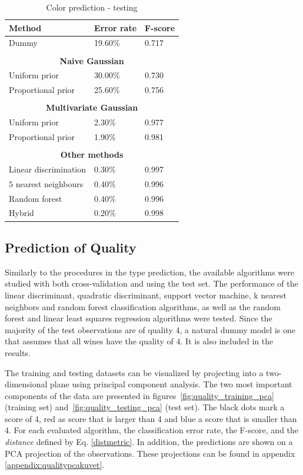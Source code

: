 \documentclass[twoside]{article}
\begin{document}
\begin{multicols}{2}
\begin{table}[H]
\caption{Color prediction - testing}
\label{table:color_testing}
\begin{tabular}{lll}
\textbf{Method} & \textbf{Error rate} & \textbf{F-score}\\
\midrule
Dummy & 19.60\% & 0.717 \\
\\
\multicolumn{3}{c}{\textbf{Naive Gaussian}} \\
Uniform prior & 30.00\% & 0.730 \\
Proportional prior & 25.60\% & 0.756 \\
\\
\multicolumn{3}{c}{\textbf{Multivariate Gaussian}} \\
Uniform prior & 2.30\% & 0.977 \\
Proportional prior & 1.90\% & 0.981 \\
\\
\multicolumn{3}{c}{\textbf{Other methods}} \\
Linear discrimination & 0.30\% & 0.997 \\
$5$ nearest neighbours & 0.40\% & 0.996 \\
Random forest & 0.40\% & 0.996 \\
Hybrid & 0.20\% & 0.998 \\

\end{tabular}
\end{table}

\subsection{Prediction of Quality}

Similarly to the procedures in the type prediction, the available algorithms were studied with both cross-validation and using the test set. 
The performance of the linear discriminant, quadratic discriminant, support vector machine, k nearest neighbors and random forest
classification algorithms, as well as the random forest and linear least squares regression algorithms were tested.
Since the majority of the test observations are of quality 4, a natural dummy model is one that assumes that all wines have the quality of 4.
It is also included in the results.

The training and testing datasets can be visualized by projecting into a two-dimensional plane using principal component analysis. The 
two most important components of the data are presented in figures~\ref{fig:quality_training_pca} (training set) and~\ref{fig:quality_testing_pca}
(test set).
The black dots mark a score of 4, red as score that is larger than 4 and blue a score that is smaller than 4.
For each evaluated algorithm, the classification error rate, the F-score, and the \emph{distance} defined by Eq. \eqref{distmetric}. In addition, the predictions are shown on a PCA projection
of the observations. These projections can be found in appendix \ref{appendix:qualitypcakuvet}.


\end{multicols}
\end{document}
